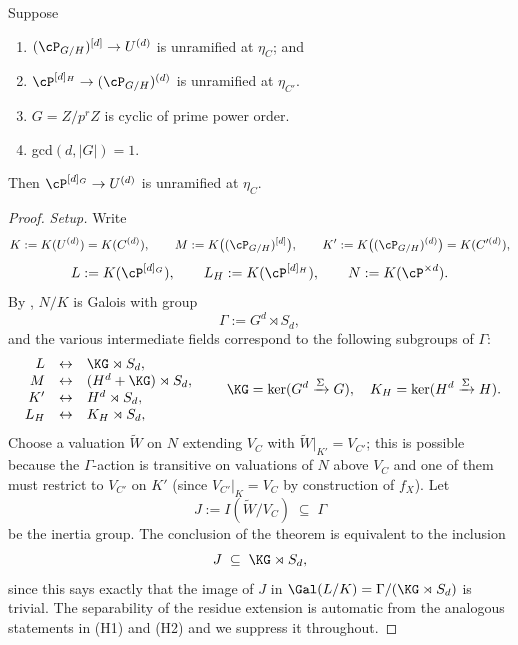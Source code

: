 \begin{theorem}\label{thm:main}
Suppose
\begin{enumerate}
  \item[\textnormal{(H1)}] $(\cP_{G/H})^{[d]} \to U^{(d)}$ is unramified at
        $\eta_C$; and
  \item[\textnormal{(H2)}] $\cP^{[d]_H} \to (\cP_{G/H})^{(d)}$ is unramified
        at $\eta_{C'}$.
  \item [\textnormal{(H3)}]$G=Z/p^rZ$ is cyclic of prime power order.
  \item [\textnormal{(H4)}] gcd$(d,|G|)=1$.
\end{enumerate}
Then $\cP^{[d]_G} \to U^{(d)}$ is unramified at $\eta_C$.
\end{theorem}

\begin{proof}
\textit{Setup.}\quad
Write
\[
K := K(U^{(d)}) = K(C^{(d)}), \qquad
M := K\bigl((\cP_{G/H})^{[d]}\bigr), \qquad
K' := K\bigl((\cP_{G/H})^{(d)}\bigr) = K(C'^{(d)}),
\]
\[
L := K(\cP^{[d]_G}), \qquad L_H := K(\cP^{[d]_H}), \qquad N := K(\cP^{\times d}).
\]
By , $N/K$ is Galois with group
\[
\Gamma := G^d \rtimes S_d,
\]
and the various intermediate fields correspond to the following subgroups of
$\Gamma$:
\[
\begin{array}{rcl}
L           & \leftrightarrow & \KG \rtimes S_d, \\
M           & \leftrightarrow & (H^d + \KG) \rtimes S_d, \\
K'          & \leftrightarrow & H^d \rtimes S_d, \\
L_H         & \leftrightarrow & K_H \rtimes S_d, \\
\end{array}
\qquad
\KG = \ker(G^d \xrightarrow{\Sigma} G), \quad
K_H = \ker(H^d \xrightarrow{\Sigma} H).
\]
Choose a valuation $\widetilde W$ on $N$ extending $V_C$ with
$\widetilde W|_{K'} = V_{C'}$; this is possible because the $\Gamma$-action is
transitive on valuations of $N$ above $V_C$ and one of them must restrict to
$V_{C'}$ on $K'$ (since $V_{C'}|_K = V_C$ by construction of $f_X$). Let
\[
J := I(\widetilde W / V_C) \;\subseteq\; \Gamma
\]
be the inertia group. The conclusion of the theorem is equivalent to the
inclusion
\begin{equation}\label{eq:goal-inertia-final}
J \;\subseteq\; \KG \rtimes S_d,
\end{equation}
since this says exactly that the image of $J$ in
$\Gal(L/K) = \Gamma/(\KG \rtimes S_d)$ is trivial. The separability of the
residue extension is automatic from the analogous statements in (H1) and (H2)
and we suppress it throughout.


\end{proof}

